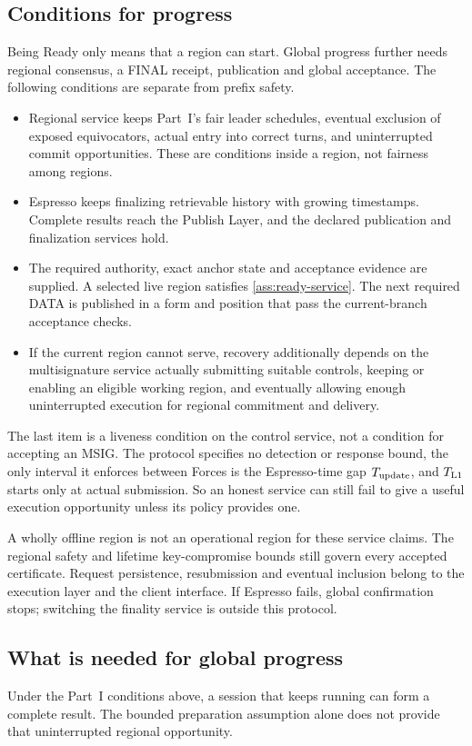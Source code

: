 \documentclass[11pt,a4paper]{article}
\newcounter{protocol}
\begin{document}
\subsection{Conditions for progress}
\label{sec:progress}
Being Ready only means that a region can start. Global progress further
needs regional consensus, a FINAL receipt, publication and global
acceptance. The following conditions are separate from prefix safety.
\begin{itemize}
\item Regional service keeps Part~I's fair leader schedules, eventual
exclusion of exposed equivocators, actual entry into correct turns, and
uninterrupted commit opportunities. These are conditions inside a region,
not fairness among regions.
\item Espresso keeps finalizing retrievable history with growing
timestamps. Complete results reach the Publish Layer, and the declared
publication and finalization services hold.
\item The required authority, exact anchor state and acceptance evidence
are supplied. A selected live region satisfies \cref{ass:ready-service}.
The next required DATA is published in a form and position that pass the
current-branch acceptance checks.
\item If the current region cannot serve, recovery additionally depends
on the multisignature service actually submitting suitable controls,
keeping or enabling an eligible working region, and eventually allowing
enough uninterrupted execution for regional commitment and delivery.
\end{itemize}
The last item is a liveness condition on the control service, not a
condition for accepting an MSIG. The protocol specifies no detection or
response bound, the only interval it enforces between Forces is the
Espresso-time gap $T_{\rm update}$, and $T_{\rm L1}$ starts only at actual
submission. So an honest service can still fail to
give a useful execution opportunity unless its policy provides one.

A wholly offline region is not an operational region for these service
claims. The regional safety and lifetime key-compromise bounds still
govern every accepted certificate. Request persistence, resubmission and
eventual inclusion belong to the execution layer and the client
interface. If Espresso fails, global confirmation stops; switching the
finality service is outside this protocol.

\subsection{What is needed for global progress}
\label{sec:global-progress}
Under the Part~I conditions above, a session that keeps running can form
a complete result. The bounded preparation assumption alone does not
provide that uninterrupted regional opportunity.
\end{document}
